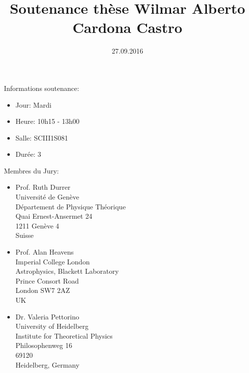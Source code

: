 \documentclass[10pt,a4paper]{article}
\title{Soutenance th\`{e}se Wilmar Alberto Cardona Castro}
\date{27.09.2016}
\begin{document}
\maketitle

Informations soutenance:

\begin{itemize}
\item Jour: Mardi
\item Heure: 10h15 - 13h00
\item Salle: SCIII1S081
\item Dur\'{e}e: 3
\end{itemize}

Membres du Jury:

\begin{itemize}
\item Prof. Ruth Durrer\\
Université de Genève\\
Département de Physique Théorique\\
Quai Ernest-Ansermet 24\\
1211 Genève 4\\
Suisse

\item Prof. Alan Heavens\\
Imperial College London\\
Astrophysics, Blackett Laboratory\\
Prince Consort Road\\
London SW7 2AZ\\
UK

\item Dr. Valeria Pettorino\\
University of Heidelberg\\
Institute for Theoretical Physics\\
Philosophenweg 16\\
69120\\
Heidelberg, Germany
\end{itemize}
\end{document}
